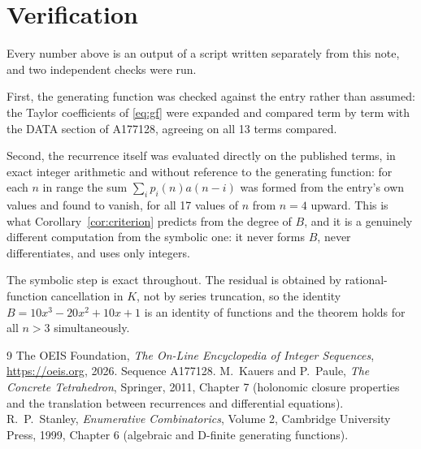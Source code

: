 \documentclass[11pt,a4paper]{article}
\theoremstyle{plain}
\theoremstyle{definition}
\begin{document}
\section{Verification}

Every number above is an output of a script written separately from this note, and two
independent checks were run.

First, the generating function was checked against the entry rather than assumed: the
Taylor coefficients of \eqref{eq:gf} were expanded and compared term by term with the DATA
section of A177128, agreeing on all 13 terms compared.

Second, the recurrence itself was evaluated directly on the published terms, in exact
integer arithmetic and without reference to the generating function: for each $n$ in range
the sum $\sum_{i}p_{i}(n)a(n-i)$ was formed from the entry's own values and found to
vanish, for all 17 values of $n$ from $n=4$ upward. This is what
Corollary~\ref{cor:criterion} predicts from the degree of $B$, and it is a genuinely
different computation from the symbolic one: it never forms $B$, never differentiates, and
uses only integers.

The symbolic step is exact throughout. The residual is obtained by rational-function
cancellation in $K$, not by series truncation, so the identity $B=10 x^{3} - 20 x^{2} + 10 x + 1$ is an
identity of functions and the theorem holds for all $n>3$ simultaneously.

\begin{thebibliography}{9}
 The OEIS Foundation, \emph{The On-Line Encyclopedia of Integer Sequences},
\url{https://oeis.org}, 2026. Sequence A177128.
 M.~Kauers and P.~Paule, \emph{The Concrete Tetrahedron}, Springer, 2011,
Chapter 7 (holonomic closure properties and the translation between recurrences and
differential equations).
 R.~P.~Stanley, \emph{Enumerative Combinatorics}, Volume 2, Cambridge
University Press, 1999, Chapter 6 (algebraic and D-finite generating functions).
\end{thebibliography}
\end{document}
